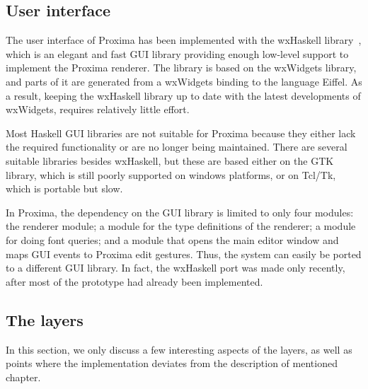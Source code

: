 \subsection{User interface}

The user interface of Proxima has been implemented with the wxHaskell library~\cite{leijen04wxHaskell}, which is  an elegant and fast GUI library providing enough low-level support to implement the Proxima renderer. The library is based on the wxWidgets library, and parts of it are generated from a wxWidgets binding to the language Eiffel. As a result, keeping the wxHaskell library up to date with the latest developments of wxWidgets, requires relatively little effort. 

Most Haskell GUI libraries are not suitable for Proxima because they either lack the required functionality or are no longer being maintained. There are several suitable libraries besides wxHaskell, but these are based either on the GTK library, which is still poorly supported on windows platforms, or on Tcl/Tk, which is portable but slow.

In Proxima, the dependency on the GUI library is limited to only four modules: the renderer module; a module for the type definitions of the renderer; a module for doing font queries; and a module that opens the main editor window and maps GUI events to Proxima edit gestures. Thus, the system can easily be ported to  a different GUI library. In fact, the wxHaskell port was made only recently, after most of the prototype had already been implemented.



\bc
\subsection{The layers}
\toHere

In this section, we only discuss a few interesting aspects of the layers, as well as points where the implementation deviates from the description of mentioned chapter.


